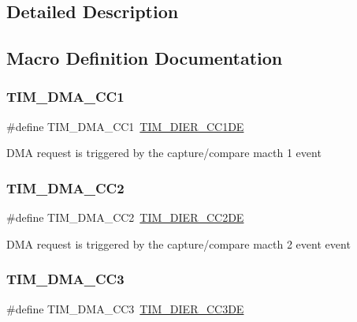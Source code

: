 \subsection{Detailed Description}


\subsection{Macro Definition Documentation}
\mbox{\label{group___t_i_m___d_m_a__sources_ga33b93e8bb82fe8e167b9e9c962c54f83}} 
\subsubsection{\texorpdfstring{TIM\_DMA\_CC1}{TIM\_DMA\_CC1}}
{\footnotesize\ttfamily \#define T\+I\+M\+\_\+\+D\+M\+A\+\_\+\+C\+C1~\mbox{\hyperlink{group___peripheral___registers___bits___definition_gae181bb16ec916aba8ba86f58f745fdfd}{T\+I\+M\+\_\+\+D\+I\+E\+R\+\_\+\+C\+C1\+DE}}}

D\+MA request is triggered by the capture/compare macth 1 event \mbox{\label{group___t_i_m___d_m_a__sources_ga792f73196a8e7424655592097d7a3fd5}} 
\subsubsection{\texorpdfstring{TIM\_DMA\_CC2}{TIM\_DMA\_CC2}}
{\footnotesize\ttfamily \#define T\+I\+M\+\_\+\+D\+M\+A\+\_\+\+C\+C2~\mbox{\hyperlink{group___peripheral___registers___bits___definition_ga58f97064991095b28c91028ca3cca28e}{T\+I\+M\+\_\+\+D\+I\+E\+R\+\_\+\+C\+C2\+DE}}}

D\+MA request is triggered by the capture/compare macth 2 event event \mbox{\label{group___t_i_m___d_m_a__sources_ga3eb2dadbd3109bced45935fb53deeee1}} 
\subsubsection{\texorpdfstring{TIM\_DMA\_CC3}{TIM\_DMA\_CC3}}
{\footnotesize\ttfamily \#define T\+I\+M\+\_\+\+D\+M\+A\+\_\+\+C\+C3~\mbox{\hyperlink{group___peripheral___registers___bits___definition_ga1567bff5dc0564b26a8b3cff1f0fe0a4}{T\+I\+M\+\_\+\+D\+I\+E\+R\+\_\+\+C\+C3\+DE}}}

